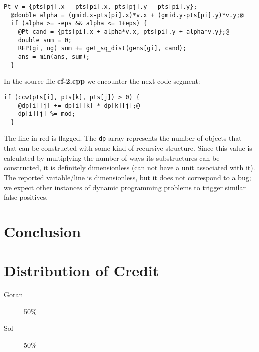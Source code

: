 \documentclass[12pt]{article}
\begin{document}
\begin{lstlisting}[label=proposal-full.cpp]
  Pt v = {pts[pj].x - pts[pi].x, pts[pj].y - pts[pi].y};
  @double alpha = (gmid.x-pts[pi].x)*v.x + (gmid.y-pts[pi].y)*v.y;@
  if (alpha >= -eps && alpha <= 1+eps) {
    @Pt cand = {pts[pi].x + alpha*v.x, pts[pi].y + alpha*v.y};@
    double sum = 0;
    REP(gi, ng) sum += get_sq_dist(gens[gi], cand);
    ans = min(ans, sum);
  }  
\end{lstlisting}

In the source file \textbf{cf-2.cpp} we encounter the next code segment:
\begin{lstlisting}[label=cf-2.cpp]
  if (ccw(pts[i], pts[k], pts[j]) > 0) {
    @dp[i][j] += dp[i][k] * dp[k][j];@
    dp[i][j] %= mod;
  }
\end{lstlisting}
The line in red is flagged.
The \texttt{dp} array represents the number of objects that that can be constructed with some kind of recursive structure.
Since this value is calculated by multiplying the number of ways its substructures can be constructed, it is definitely dimensionless (can not have a unit associated with it).
The reported variable/line is dimensionless, but it does not correspond to a bug; we expect other instances of dynamic programming problems to trigger similar false positives.

\section{Conclusion}

\section{Distribution of Credit}
\begin{description}
  \item[Goran] 50\%
    \item[Sol] 50\%
\end{description}



\end{document}
